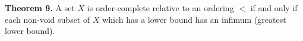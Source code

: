 \textbf{Theorem 9.} A set $X$ is order-complete relative to an ordering $<$ if and only if each non-void subset of $X$ which has a lower bound has an infimum (greatest lower bound).
